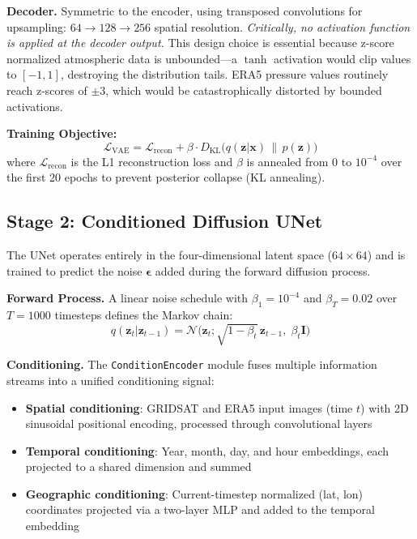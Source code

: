 \documentclass[12pt, a4paper]{article}
\begin{document}
\textbf{Decoder.} Symmetric to the encoder, using transposed convolutions for upsampling: $64 \rightarrow 128 \rightarrow 256$ spatial resolution. \textit{Critically, no activation function is applied at the decoder output.} This design choice is essential because z-score normalized atmospheric data is unbounded---a $\tanh$ activation would clip values to $[-1, 1]$, destroying the distribution tails. ERA5 pressure values routinely reach z-scores of $\pm3$, which would be catastrophically distorted by bounded activations.

\textbf{Training Objective:}
\begin{equation}
\mathcal{L}_{\text{VAE}} = \mathcal{L}_{\text{recon}} + \beta \cdot D_{\text{KL}}\big(q(\mathbf{z}|\mathbf{x}) \,\|\, p(\mathbf{z})\big)
\label{eq:vae_loss}
\end{equation}
where $\mathcal{L}_{\text{recon}}$ is the L1 reconstruction loss and $\beta$ is annealed from 0 to $10^{-4}$ over the first 20 epochs to prevent posterior collapse (KL annealing).

\subsection{Stage 2: Conditioned Diffusion UNet}

The UNet operates entirely in the four-dimensional latent space ($64 \times 64$) and is trained to predict the noise $\boldsymbol{\epsilon}$ added during the forward diffusion process.

\textbf{Forward Process.} A linear noise schedule with $\beta_1 = 10^{-4}$ and $\beta_T = 0.02$ over $T = 1000$ timesteps defines the Markov chain:
\begin{equation}
q(\mathbf{z}_t | \mathbf{z}_{t-1}) = \mathcal{N}\big(\mathbf{z}_t; \sqrt{1-\beta_t}\,\mathbf{z}_{t-1},\; \beta_t \mathbf{I}\big)
\end{equation}

\textbf{Conditioning.} The \texttt{ConditionEncoder} module fuses multiple information streams into a unified conditioning signal:
\begin{itemize}
\item \textbf{Spatial conditioning}: GRIDSAT and ERA5 input images (time $t$) with 2D sinusoidal positional encoding, processed through convolutional layers
\item \textbf{Temporal conditioning}: Year, month, day, and hour embeddings, each projected to a shared dimension and summed
\item \textbf{Geographic conditioning}: Current-timestep normalized (lat, lon) coordinates projected via a two-layer MLP and added to the temporal embedding
\end{itemize}
\end{document}
